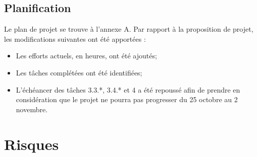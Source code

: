 \documentclass[a4paper, oneside, 12pt, titlepage]{article}
\begin{document}
\subsection{Planification}


Le plan de projet se trouve à l'annexe A. Par rapport à la proposition de projet, les
modifications suivantes ont été apportées :

\begin{itemize}
  \item Les efforts actuels, en heures, ont été ajoutés;
  \item Les tâches complétées ont été identifiées;
  \item L'échéancer des tâches 3.3.*, 3.4.* et 4 a été repoussé afin de prendre en considération que
    le projet ne pourra pas progresser du 25 octobre au 2 novembre.
\end{itemize}

\section{Risques}

%
%
\end{document}
